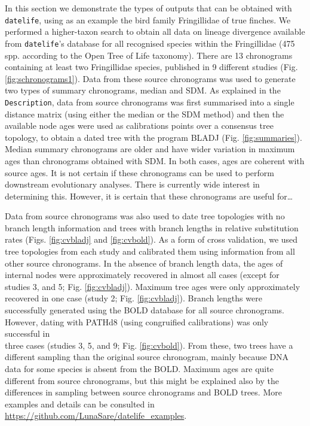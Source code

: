 \documentclass[]{article}
\begin{document}
In this section we demonstrate the types of outputs that can be obtained with \texttt{datelife}, using as an example the bird family Fringillidae of true finches. We performed a higher-taxon search to obtain all data on lineage divergence available from \texttt{datelife}'s database for all recognised species within the Fringillidae (475 spp. according to the Open Tree of Life taxonomy). There are 13 chronograms containing at least two Fringillidae species, published in 9 different studies (Fig. \ref{fig:schronograms1}).
Data from these source chronograms was used to generate two types of summary chronograms, median and SDM. As explained in the \texttt{Description}, data from source chronograms was first summarised into a single distance matrix (using either the median or the SDM method) and then the available node ages were used as calibrations points over a consensus tree topology, to obtain a dated tree with the program BLADJ (Fig. \ref{fig:summaries}). Median summary chronograms are older and have wider variation in maximum ages than chronograms obtained with SDM. In both cases, ages are coherent with source ages.
It is not certain if these chronograms can be used to perform downstream evolutionary analyses. There is currently wide interest in determining this. However, it is certain that these chronograms are useful for\ldots{}

Data from source chronograms was also used to date tree topologies with no branch length information and trees with branch lengths in relative substitution rates (Figs. \ref{fig:cvbladj} and \ref{fig:cvbold}). As a form of cross validation, we used tree topologies from each study and calibrated them using information from all other source chronograms. In the absence of branch length data, the ages of internal nodes were approximately recovered in almost all cases (except for studies 3, and 5; Fig. \ref{fig:cvbladj}). Maximum tree ages were only approximately recovered in one case (study 2; Fig. \ref{fig:cvbladj}).
Branch lengths were successfully generated using the BOLD database for all source chronograms. However, dating with PATHd8 (using congruified calibrations) was only successful in\\
three cases (studies 3, 5, and 9; Fig. \ref{fig:cvbold}). From these, two trees have a different sampling than the original source chronogram, mainly because DNA data for some species is absent from the BOLD. Maximum ages are quite different from source chronograms, but this might be explained also by the differences in sampling between source chronograms and BOLD trees.
More examples and details can be consulted in \url{https://github.com/LunaSare/datelife_examples}.
\end{document}
